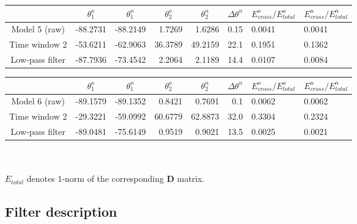 \documentclass[a4paper,11pt]{article}
\begin{document}
\vspace{\baselineskip}

\renewcommand{\arraystretch}{1.5}
\footnotesize
\begin{tabular}{c|rr|rr|r|ll}
				&\multicolumn{1}{c}{$\theta_1^o$} & \multicolumn{1}{c|}{$\theta_1^n$} & \multicolumn{1}{c}{$\theta_2^o$} & \multicolumn{1}{c|}{$\theta_2^n$} & \multicolumn{1}{c|}{$\Delta\theta^n$}& \multicolumn{1}{c}{$E_{cross}^o/E_{total}^o$} & \multicolumn{1}{c}{$E_{cross}^n/E_{total}^n$} \\ \hline
\hline  Model 5 (raw) & -88.2731 & -88.2149 & 1.7269 & 1.6286 & 0.15 & 0.0041 & 0.0041 \\
		Time window 2 & -53.6211 & -62.9063 & 36.3789 & 49.2159 & 22.1 & 0.1951 & 0.1362 \\
	   Low-pass filter & -87.7936 & -73.4542 & 2.2064 & 2.1189 & 14.4 & 0.0107 & 0.0084 \\ 	   
 	    \hline 
\end{tabular} 
\normalsize
\renewcommand{\arraystretch}{1.0}

\vspace{\baselineskip}

\renewcommand{\arraystretch}{1.5}
\footnotesize
\begin{tabular}{c|rr|rr|r|ll}
				&\multicolumn{1}{c}{$\theta_1^o$} & \multicolumn{1}{c|}{$\theta_1^n$} & \multicolumn{1}{c}{$\theta_2^o$} & \multicolumn{1}{c|}{$\theta_2^n$} & \multicolumn{1}{c|}{$\Delta\theta^n$}& \multicolumn{1}{c}{$E_{cross}^o/E_{total}^o$} & \multicolumn{1}{c}{$E_{cross}^n/E_{total}^n$} \\ \hline
\hline  Model 6 (raw) & -89.1579 & -89.1352 & 0.8421 & 0.7691 & 0.1 & 0.0062 & 0.0062 \\
		Time window 2 & -29.3221 & -59.0992 & 60.6779 & 62.8873 & 32.0 & 0.3304 & 0.2324 \\
	   Low-pass filter & -89.0481 & -75.6149 & 0.9519 & 0.9021 & 13.5 & 0.0025 & 0.0021 \\ 	   
 	    \hline 
\end{tabular} 
\normalsize
\\ \\
\quad *$E_{total}$ denotes 1-norm of the corresponding $\mathbf{D}$ matrix.
\renewcommand{\arraystretch}{1.0}

\vspace{\baselineskip}

\newpage

\subsection*{Filter description}
\end{document}
